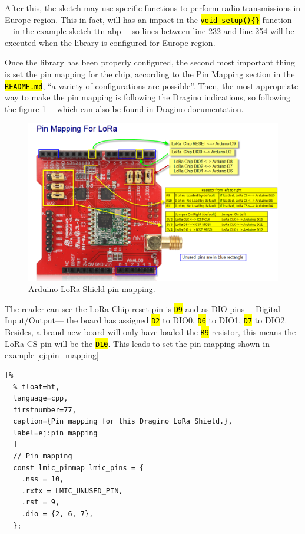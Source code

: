 \documentclass[11pt,a4paper,dvipsnames,twoside]{article}
\newcommand{\cmd}[1] {\hl{\texttt{#1}}}
\begin{document}
After this, the sketch may use specific functions to perform radio transmissions in Europe region. This in fact, will has an impact in the \cmd{void setup()\{\}} function ---in the example sketch ttn-abp--- so lines between \href{https://github.com/mcci-catena/arduino-lmic/blob/master/examples/ttn-abp/ttn-abp.ino#L232}{line 232} and line 254 will be executed when the library is configured for Europe region.

Once the library has been properly configured, the second most important thing is set the pin mapping for the chip, according to the \href{https://github.com/mcci-catena/arduino-lmic#pin-mapping}{Pin Mapping section} in the \cmd{README.md}, \enquote{a variety of configurations are possible}. Then, the most appropriate way to make the pin mapping is following the Dragino indications, so following the figure \ref{fig:Ard_LoRa_Shield_pin_mapping} ---which can also be found in \href{http://wiki.dragino.com/index.php?title=Lora_Shield#Pin_Mapping_and_Unused_Pins}{Dragino documentation}.

\begin{figure}[ht]
  \centering
  \includegraphics[width=.9\textwidth]{../pictures/LoRa_Shield_Pin_Mapping.png}
  \caption{Arduino LoRa Shield pin mapping.}
  \label{fig:Ard_LoRa_Shield_pin_mapping}
\end{figure}

The reader can see the LoRa Chip reset pin is \cmd{D9} and as DIO pins ---Digital Input/Output--- the board has assigned \cmd{D2} to DIO0, \cmd{D6} to DIO1, \cmd{D7} to DIO2. Besides, a brand new board will only have loaded the \cmd{R9} resistor, this means the LoRa CS pin will be the \cmd{D10}. This leads to set the pin mapping shown in example \ref{ej:pin_mapping}

\begin{lstlisting}[%
  % float=ht,
  language=cpp,
  firstnumber=77,
  caption={Pin mapping for this Dragino LoRa Shield.},
  label=ej:pin_mapping
  ]
  // Pin mapping
  const lmic_pinmap lmic_pins = {
    .nss = 10,
    .rxtx = LMIC_UNUSED_PIN,
    .rst = 9,
    .dio = {2, 6, 7},
  };
\end{lstlisting}
\end{document}
